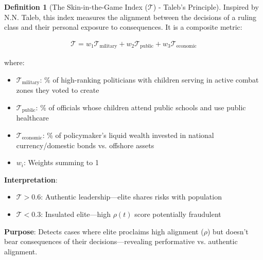\documentclass[11pt,a4paper]{article}
\theoremstyle{definition}
\newtheorem{definition}{Definition}[section]
\theoremstyle{remark}
\begin{document}
\begin{definition}[The Skin-in-the-Game Index (\(\mathcal{T}\)) - Taleb's Principle]
Inspired by N.N. Taleb, this index measures the alignment between the decisions of a ruling class and their personal exposure to consequences. It is a composite metric:

\begin{align}
\mathcal{T} = w_1 \mathcal{T}_{\text{military}} + w_2 \mathcal{T}_{\text{public}} + w_3 \mathcal{T}_{\text{economic}}
\end{align}

where:
\begin{itemize}
    \item \(\mathcal{T}_{\text{military}}\): \% of high-ranking politicians with children serving in active combat zones they voted to create
    \item \(\mathcal{T}_{\text{public}}\): \% of officials whose children attend public schools and use public healthcare
    \item \(\mathcal{T}_{\text{economic}}\): \% of policymaker's liquid wealth invested in national currency/domestic bonds vs. offshore assets
    \item \(w_i\): Weights summing to 1
\end{itemize}

\textbf{Interpretation}:
\begin{itemize}
    \item \(\mathcal{T} > 0.6\): Authentic leadership—elite shares risks with population
    \item \(\mathcal{T} < 0.3\): Insulated elite—high \(\rho(t)\) score potentially fraudulent
\end{itemize}

\textbf{Purpose}: Detects cases where elite proclaims high alignment (\(\rho\)) but doesn't bear consequences of their decisions—revealing performative vs. authentic alignment.
\end{definition}
\end{document}
